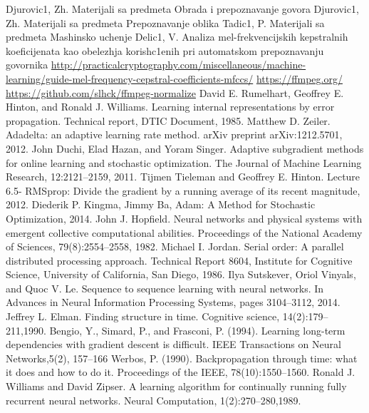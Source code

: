 \documentclass[a4paper, openany, oneside, 11pt]{book}
\begin{document}
\begin{thebibliography}{99}
Djurovic1, Zh. Materijali sa predmeta Obrada i prepoznavanje govora
Djurovic1, Zh. Materijali sa predmeta Prepoznavanje oblika
Tadic1, P. Materijali sa predmeta Mashinsko uchenje
Delic1, V. Analiza mel-frekvencijskih kepstralnih koeficijenata kao obelezhja korish\-c1enih pri automat\-skom prepoznavanju govornika
\selectfont
\url{http://practicalcryptography.com/miscellaneous/machine-learning/guide-mel-frequency-cepstral-coefficients-mfccs/}
\url{https://ffmpeg.org/}
\url{https://github.com/slhck/ffmpeg-normalize}
David E. Rumelhart, Geoffrey E. Hinton, and Ronald J. Williams. Learning
internal representations by error propagation. Technical report, DTIC Document, 1985.
Matthew D. Zeiler. Adadelta: an adaptive learning rate method. arXiv preprint arXiv:1212.5701, 2012.
John Duchi, Elad Hazan, and Yoram Singer. Adaptive subgradient methods for
online learning and stochastic optimization. The Journal of Machine Learning Research, 12:2121–2159, 2011.
Tijmen Tieleman and Geoffrey E. Hinton. Lecture 6.5- RMSprop: Divide
the gradient by a running average of its recent magnitude, 2012.
Diederik P. Kingma, Jimmy Ba, Adam: A Method for Stochastic Optimization, 2014.
John J. Hopfield. Neural networks and physical systems with emergent collective
computational abilities. Proceedings of the National Academy of Sciences, 79(8):2554–2558, 1982.
Michael I. Jordan. Serial order: A parallel distributed processing approach.
Technical Report 8604, Institute for Cognitive Science, University of California, San Diego, 1986.
Ilya Sutskever, Oriol Vinyals, and Quoc V. Le. Sequence to sequence learning
with neural networks. In Advances in Neural Information Processing Systems,
pages 3104–3112, 2014.
Jeffrey L. Elman. Finding structure in time. Cognitive science, 14(2):179–211,1990.
Bengio, Y., Simard, P., and Frasconi, P. (1994). Learning long-term dependencies with gradient descent is
difficult. IEEE Transactions on Neural Networks,5(2), 157–166
Werbos, P. (1990). Backpropagation through time: what it does and how to do it. Proceedings of the
IEEE, 78(10):1550–1560.
Ronald J. Williams and David Zipser. A learning algorithm for continually running fully recurrent neural networks. Neural Computation, 1(2):270–280,1989.

\end{thebibliography}
\end{document}
